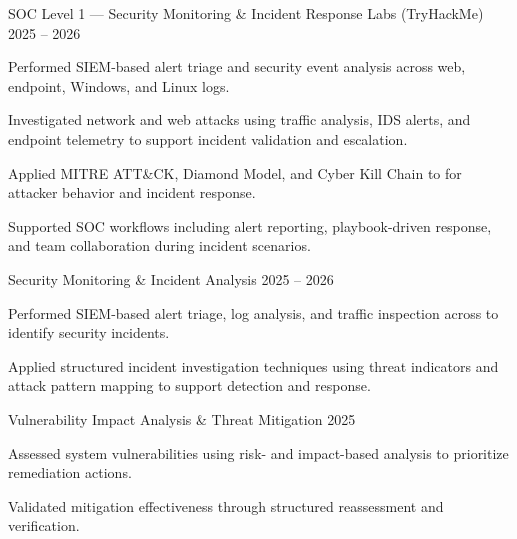 


\begin{cventries}

  \cventry
    {SOC Level 1 — Security Monitoring \& Incident Response Labs (TryHackMe)}
    {2025 -- 2026}
    {
      \begin{cvitems}
        \item {Performed SIEM-based alert triage and security event analysis across web, endpoint, Windows, and Linux logs.}
        \item {Investigated network and web attacks using traffic analysis, IDS alerts, and endpoint telemetry to support incident validation and escalation.}
        \item {Applied MITRE ATT\&CK, Diamond Model, and Cyber Kill Chain to for attacker behavior and incident response.}
        \item {Supported SOC workflows including alert reporting, playbook-driven response, and team collaboration during incident scenarios.}
      \end{cvitems}
    }
    \vspace{4mm}

  \cventry
    {Security Monitoring \& Incident Analysis}
    {2025 -- 2026}
    {
      \begin{cvitems}
        \item {Performed SIEM-based alert triage, log analysis, and traffic inspection across to identify security incidents.}
        \item {Applied structured incident investigation techniques using threat indicators and attack pattern mapping to support detection and response.}
      \end{cvitems}
    }
    \vspace{4mm}

  \cventry
    {Vulnerability Impact Analysis \& Threat Mitigation}
    {2025}
    {
      \begin{cvitems}
        \item {Assessed system vulnerabilities using risk- and impact-based analysis to prioritize remediation actions.}
        \item {Validated mitigation effectiveness through structured reassessment and verification.}
      \end{cvitems}
    }
    \vspace{4mm}


\end{cventries}
